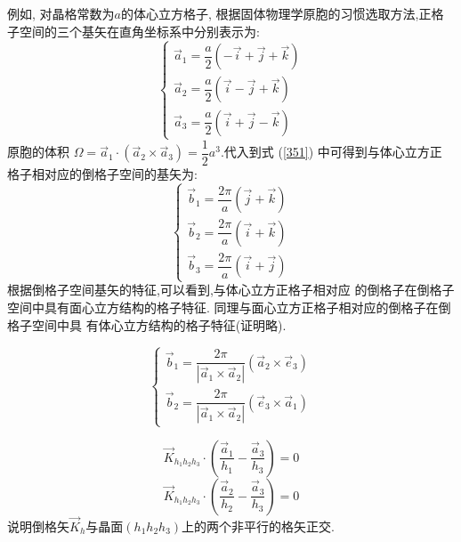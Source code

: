 \documentclass[UTF8,12pt, a4paper, oneside]{ctexart}
\begin{document}
    {例如, 对晶格常数为$a$的体心立方格子, 根据固体物理学原胞的习惯选取方法,正格子空间的三个基矢在直角坐标系中分别表示为:$$
        \left\{\begin{array}{l}
        \vec{a}_{1}=\dfrac{a}{2}(-\vec{i}+\vec{j}+\vec{k}) \\
        \vec{a}_{2}=\dfrac{a}{2}(\vec{i}-\vec{j}+\vec{k}) \\
        \vec{a}_{3}=\dfrac{a}{2}(\vec{i}+\vec{j}-\vec{k})
        \end{array}\right.
        $$
        原胞的体积 $\Omega=\vec{a}_{1} \cdot\left(\vec{a}_{2} \times \vec{a}_{3}\right)=\dfrac{1}{2} {a}^{3}$.代入到式 (\ref{351}) 中可得到与体心立方正 格子相对应的倒格子空间的基矢为:
        $$
        \left\{\begin{array}{l}
        \vec{b}_{1}=\dfrac{2 \pi}{a}(\vec{j}+\vec{k}) \\
        \vec{b}_{2}=\dfrac{2 \pi}{a}(\vec{i}+\vec{k}) \\
        \vec{b}_{3}=\dfrac{2 \pi}{a}(\vec{i}+\vec{j})
        \end{array}\right.
        $$根据倒格子空间基矢的特征,可以看到,与体心立方正格子相对应
        的倒格子在倒格子空间中具有面心立方结构的格子特征.
        同理与面心立方正格子相对应的倒格子在倒格子空间中具
        有体心立方结构的格子特征(证明略).}

    {\[\left\{\begin{array}{l}
            \vec{b}_{1}=\dfrac{2 \pi}{|\vec{a}_{1} \times \vec{a}_{2}|}(\vec{a}_{2} \times \vec{e}_{3}) \\
            \vec{b}_{2}=\dfrac{2 \pi}{|\vec{a}_{1} \times \vec{a}_{2}|}(\vec{e}_{3} \times \vec{a}_{1})
            \end{array}\right.\]}
  
    {\[\vec{K}_{h_{1} h_{2} h_{3}} \cdot(\dfrac{\vec{a}_{1}}{h_{1}}-\dfrac{\vec{a}_{3}}{h_{3}})=0\]
        \[\vec{K}_{h_{1} h_{2} h_{3}} \cdot(\dfrac{\vec{a}_{2}}{h_{2}}-\dfrac{\vec{a}_{3}}{h_{3}})=0
        \]说明倒格矢$\vec{K}_{h}$与晶面$(h_1h_2h_3)$上的两个非平行的格矢正交.}
\end{document}
